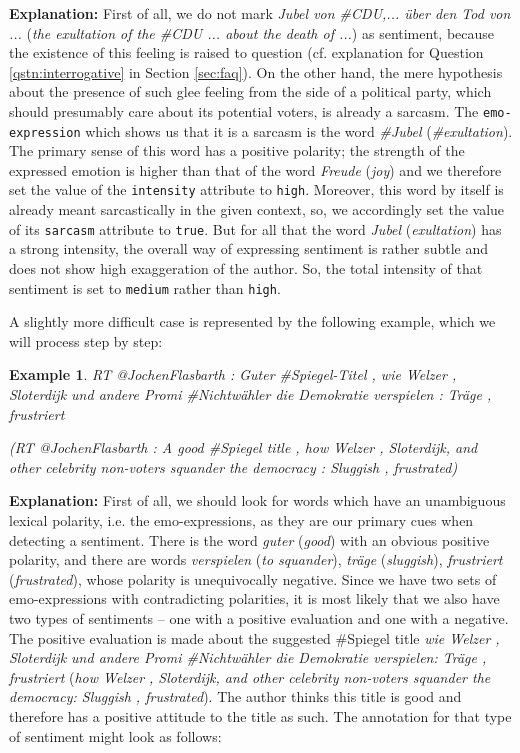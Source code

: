 \documentclass[11pt,a4paper]{article}
\theoremstyle{mytheoremstyle}
\newtheorem{exmp}{Example}[section]
\begin{document}
\textbf{Explanation:} First of all, we do not mark \textit{Jubel von
  \#CDU,... \"uber den Tod von ...} (\textit{the exultation of the
  \#CDU ... about the death of ...}) as sentiment, because the
existence of this feeling is raised to question (cf. explanation for
Question \ref{qstn:interrogative} in Section \ref{sec:faq}).  On the
other hand, the mere hypothesis about the presence of such glee
feeling from the side of a political party, which should presumably
care about its potential voters, is already a sarcasm.  The
\texttt{emo-expression} which shows us that it is a sarcasm is the
word \textit{\#Jubel} (\textit{\#exultation}).  The primary sense of
this word has a positive polarity; the strength of the expressed
emotion is higher than that of the word \textit{Freude} (\textit{joy})
and we therefore set the value of the \texttt{intensity} attribute to
\texttt{high}.  Moreover, this word by itself is already meant
sarcastically in the given context, so, we accordingly set the value
of its \texttt{sarcasm} attribute to \texttt{true}.  But for all that
the word \textit{Jubel} (\textit{exultation}) has a strong intensity,
the overall way of expressing sentiment is rather subtle and does not
show high exaggeration of the author.  So, the total intensity of
that sentiment is set to \texttt{medium} rather than \texttt{high}.

A slightly more difficult case is represented by the following
example, which we will process step by step:
\begin{exmp}
  \footnotesize RT @JochenFlasbarth : Guter \#Spiegel-Titel , wie
  Welzer , Sloterdijk und andere Promi \#Nichtw\"ahler die Demokratie
  verspielen : Tr\"age , frustriert

  {\scriptsize(RT @JochenFlasbarth : A good \#Spiegel title , how
    Welzer , Sloterdijk, and other celebrity non-voters squander the
    democracy : Sluggish , frustrated)}\label{exmp:nested-2}
\end{exmp}

\textbf{Explanation:} First of all, we should look for words which
have an unambiguous lexical polarity, i.e. the emo-expressions, as
they are our primary cues when detecting a sentiment.  There is the
word \textit{guter} (\textit{good}) with an obvious positive polarity,
and there are words \textit{verspielen} (\textit{to squander}),
\textit{tr\"age} (\textit{sluggish}), \textit{frustriert}
(\textit{frustrated}), whose polarity is unequivocally negative.
Since we have two sets of emo-expressions with contradicting
polarities, it is most likely that we also have two types of
sentiments -- one with a positive evaluation and one with a negative.
The positive evaluation is made about the suggested \#Spiegel title
\textit{wie Welzer , Sloterdijk und andere Promi \#Nichtw\"ahler die
  Demokratie verspielen: Tr\"age , frustriert} (\textit{how Welzer ,
  Sloterdijk, and other celebrity non-voters squander the democracy:
  Sluggish , frustrated}).  The author thinks this title is good and
therefore has a positive attitude to the title as such.  The
annotation for that type of sentiment might look as follows:
\end{document}
